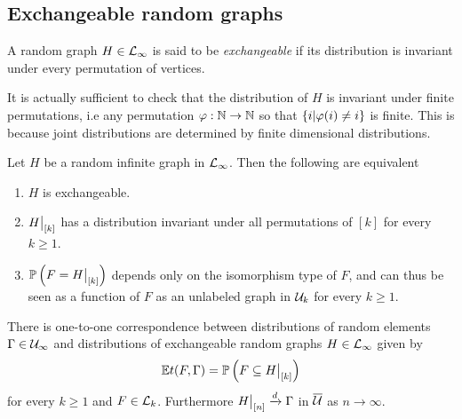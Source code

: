 \documentclass{article}
\begin{document}
\subsection{Exchangeable random graphs}
\begin{definition}
  A random graph $H \in \Lg_{\infty}$ is said to be \emph{exchangeable} if its distribution is invariant under every permutation of vertices. 
\end{definition}

It is actually sufficient to check that the distribution of $H$ is invariant under finite permutations, i.e any permutation $\phi: \N \to \N$ so that $\left\{ i | \varphi(i) \neq i \right\}$ is finite. This is because joint distributions are determined by finite dimensional distributions.

\begin{lemma}
  \label{lem:exch}
  Let $H$ be a random infinite graph in $\Lg_{\infty}$. Then the following are equivalent
  \begin{enumerate}[label=(\roman*)]
    \item $H$ is exchangeable.
    \item $\restr{H}{[k]}$ has a distribution invariant under all permutations of $[k]$ for every $k \geq 1$.
    \item $\Pb(F = \restr{H}{[k]})$ depends only on the isomorphism type of $F$, and can thus be seen as a function of $F$ as an unlabeled graph in $\Ug_{k}$ for every $k \geq 1$.
  \end{enumerate}
\end{lemma}

\begin{theorem}
  \label{thm:corres}
  There is one-to-one correspondence between distributions of random elements $\Gamma \in \Ug_{\infty}$ and distributions of exchangeable random graphs $H \in \Lg_{\infty}$ given by
  \begin{equation}
    \Ex t(F, \Gamma) = \Pb(F \subseteq \restr{H}{[k]})
    \label{eq:corres}
  \end{equation}
  for every $k \geq 1$ and $F \in \Lg_{k}$. Furthermore $\restr{H}{[n]} \dconv \Gamma$ in $\Ug*$ as $n \to \infty$.
\end{theorem}
\end{document}
